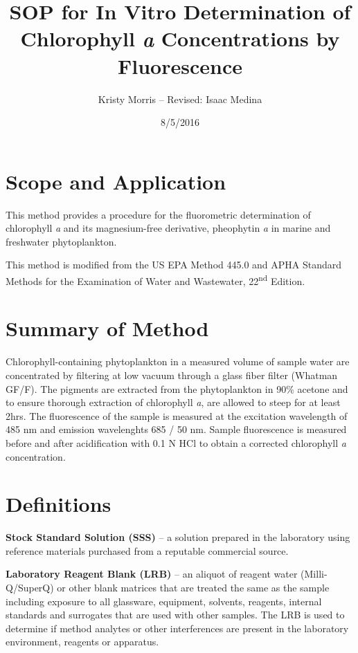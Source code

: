 \documentclass[12pt]{../SOP3_alpha}
\author{Kristy Morris -- Revised: Isaac Medina}
\title{SOP for In Vitro Determination of Chlorophyll \textit{a} Concentrations by Fluorescence}
\date{8/5/2016}
\begin{document}


\maketitle

 \section{Scope and Application}

\NP This method provides a procedure for the fluorometric determination of chlorophyll \textit{a} and its magnesium-free derivative, pheophytin \textit{a} in marine and freshwater phytoplankton.

\NP This method is modified from the US EPA Method 445.0 and APHA Standard Methods for the Examination of Water and Wastewater, 22\textsuperscript{nd} Edition. 

\section{Summary of Method}

\NP Chlorophyll-containing phytoplankton in a measured volume of sample water are concentrated by filtering at low vacuum through a glass fiber filter (Whatman GF/F). The pigments are extracted from the phytoplankton in 90\% acetone and to ensure thorough extraction of chlorophyll \textit{a}, are allowed to steep for at least 2hrs. The fluorescence of the sample is measured at the excitation wavelength of 485 nm and emission wavelenghts 685 / 50 nm. Sample fluorescence is measured before and after acidification with 0.1 N HCl to obtain a corrected chlorophyll \textit{a} concentration. 


\section{Definitions}
\NP \textbf{Stock Standard Solution (SSS)} -- a solution prepared in the laboratory using reference materials purchased from a reputable commercial source.

\NP \textbf{Laboratory Reagent Blank (LRB)} -- an aliquot of reagent water (Milli-Q/SuperQ) or other blank matrices that are treated the same as the sample including exposure to all glassware, equipment, solvents, reagents, internal standards and surrogates that are used with other samples. The LRB is used to determine if method analytes or other interferences are present in the laboratory environment, reagents or apparatus. 
\end{document}
